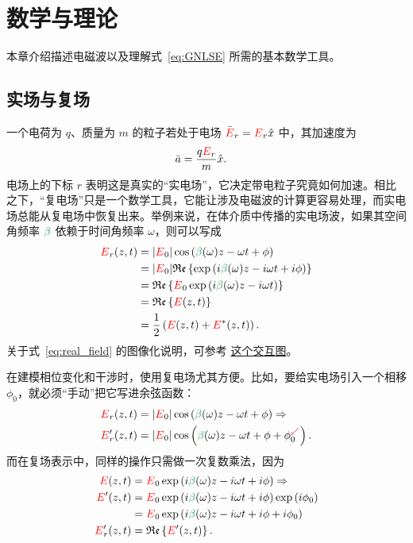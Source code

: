 \chapter{数学与理论}
\label{ch:MathAndTheory}

本章介绍描述电磁波以及理解式~\ref{eq:GNLSE} 所需的基本数学工具。


\section{实场与复场}
一个电荷为 $q$、质量为 $m$ 的粒子若处于电场 $\Bar{\textcolor{red}{E}}_r=\textcolor{red}{E}_r \hat{x}$ 中，其加速度为
\begin{align}
    \Bar{a} &=  \frac{q\textcolor{red}{E}_r}{m}\hat{x}.
\end{align}
电场上的下标 $r$ 表明这是真实的“实电场”，它决定带电粒子究竟如何加速。相比之下，“复电场”只是一个数学工具，它能让涉及电磁波的计算更容易处理，而实电场总能从复电场中恢复出来。举例来说，在体介质中传播的实电场波，如果其空间角频率 $\betag$ 依赖于时间角频率 $\omega$，则可以写成
\begin{align}
\label{eq:real_field}
    \E_r(z,t) &= |\E_0|\cos\left(\betag(\omega)z-\omega t+\phi\right) \\\nonumber
     &=|\E_0| \real\left\{  \exp\left( i\betag(\omega)z-i\omega t+i\phi \right) \right\} \\ \nonumber
     &= \real\left\{ \E_0 \exp\left( i\betag(\omega)z-i\omega t\right) \right\}  \\ \nonumber
     &= \real\left\{ \E(z,t) \right\}  \\ \nonumber
     &=  \frac{1}{2}\left( \E(z,t) + \E^*(z,t) \right).
\end{align}
关于式~\ref{eq:real_field} 的图像化说明，可参考 \href{https://www.desmos.com/calculator/fgvozursrl}{这个交互图}。

在建模相位变化和干涉时，使用复电场尤其方便。比如，要给实电场引入一个相移 $\phi_0$，就必须“手动”把它写进余弦函数：
\begin{align}
\label{eq:insert_phase}
    \E_r(z,t) &= |\E_0|\cos\left(\betag(\omega)z-\omega t+\phi\right) \Rightarrow \\ \nonumber \E_r'(z,t) &= |\E_0|\cos\left(\betag(\omega)z-\omega t+\phi+\phi_0^{\textcolor{Red}{\swarrow}}\right).
\end{align}
而在复场表示中，同样的操作只需做一次复数乘法，因为
\begin{align}
\label{eq:insert_phase_complex}
    \E(z,t) &=\E_0 \exp\left( i\betag(\omega)z-i\omega t+ i\phi\right)\Rightarrow \\ \nonumber \E'(z,t) &=  \E_0 \exp\left( i\betag(\omega)z-i\omega t +i\phi\right)\exp\left( i\phi_0\right) \\ \nonumber
    &=\E_0 \exp\left( i\betag(\omega)z-i\omega t +i\phi+ i\phi_0\right) \\ \nonumber
    \E_r'(z,t) &= \real\left\{  \E'(z,t)   \right\}.
\end{align}

